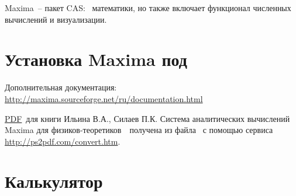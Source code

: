 Maxima\ -- пакет CAS: \
математики, но также включает функционал численных вычислений и визуализации.

\section{Установка Maxima под \win}









\bigskip
Дополнительная документация:
\url{http://maxima.sourceforge.net/ru/documentation.html}

\bigskip
\href{https://drive.google.com/file/d/0B0u4WeMjO894M01wZmNkSW9GRHM/view?usp=sharing}{PDF}\
для книги Ильина В.А., Силаев П.К. Система аналитических вычислений Maxima для
физиков-теоретиков\ \cite{maxphis}\ получена из файла \file{.ps}\ с помощью
сервиса \url{http://ps2pdf.com/convert.htm}.

\section{Калькулятор}


